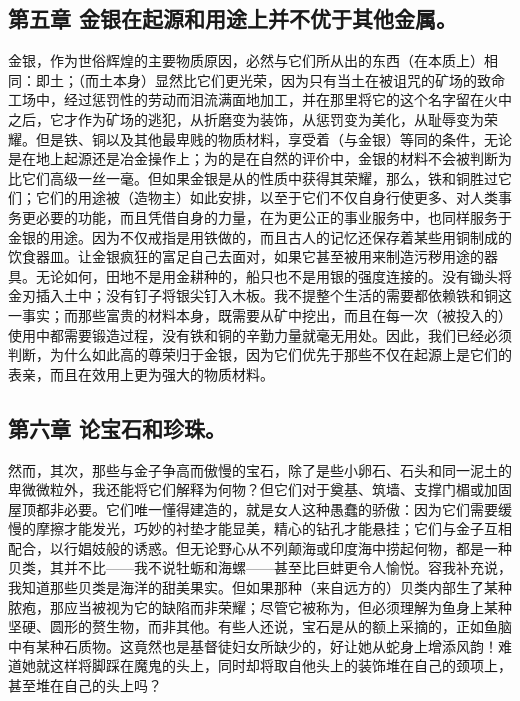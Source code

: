 
\subsection{第五章 金银在起源和用途上并不优于其他金属。}

金银，作为世俗辉煌的主要物质原因，必然与它们所从出的东西（在本质上）相同：即土；（而土本身）显然比它们更光荣，因为只有当土在被诅咒的矿场的致命工场中，经过惩罚性的劳动而泪流满面地加工，并在那里将它的这个名字留在火中之后，它才作为矿场的逃犯，从折磨变为装饰，从惩罚变为美化，从耻辱变为荣耀。但是铁、铜以及其他最卑贱的物质材料，享受着（与金银）等同的条件，无论是在地上起源还是冶金操作上；为的是在自然的评价中，金银的材料不会被判断为比它们高级一丝一毫。但如果金银是从的性质中获得其荣耀，那么，铁和铜胜过它们；它们的用途被（造物主）如此安排，以至于它们不仅自身行使更多、对人类事务更必要的功能，而且凭借自身的力量，在为更公正的事业服务中，也同样服务于金银的用途。因为不仅戒指是用铁做的，而且古人的记忆还保存着某些用铜制成的饮食器皿。让金银疯狂的富足自己去面对，如果它甚至被用来制造污秽用途的器具。无论如何，田地不是用金耕种的，船只也不是用银的强度连接的。没有锄头将金刃插入土中；没有钉子将银尖钉入木板。我不提整个生活的需要都依赖铁和铜这一事实；而那些富贵的材料本身，既需要从矿中挖出，而且在每一次（被投入的）使用中都需要锻造过程，没有铁和铜的辛勤力量就毫无用处。因此，我们已经必须判断，为什么如此高的尊荣归于金银，因为它们优先于那些不仅在起源上是它们的表亲，而且在效用上更为强大的物质材料。\par


\subsection{第六章 论宝石和珍珠。}

然而，其次，那些与金子争高而傲慢的宝石，除了是些小卵石、石头和同一泥土的卑微微粒外，我还能将它们解释为何物？但它们对于奠基、筑墙、支撑门楣或加固屋顶都非必要。它们唯一懂得建造的，就是女人这种愚蠢的骄傲：因为它们需要缓慢的摩擦才能发光，巧妙的衬垫才能显美，精心的钻孔才能悬挂；它们与金子互相配合，以行娼妓般的诱惑。但无论野心从不列颠海或印度海中捞起何物，都是一种贝类，其并不比——我不说牡蛎和海螺——甚至比巨蚌更令人愉悦。容我补充说，我知道那些贝类是海洋的甜美果实。但如果那种（来自远方的）贝类内部生了某种脓疱，那应当被视为它的缺陷而非荣耀；尽管它被称为，但必须理解为鱼身上某种坚硬、圆形的赘生物，而非其他。有些人还说，宝石是从的额上采摘的，正如鱼脑中有某种石质物。这竟然也是基督徒妇女所缺少的，好让她从蛇身上增添风韵！难道她就这样将脚踩在魔鬼的头上，同时却将取自他头上的装饰堆在自己的颈项上，甚至堆在自己的头上吗？\par

